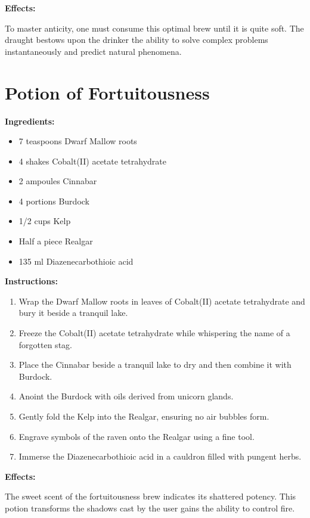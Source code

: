 \documentclass{article}
\begin{document}
\textbf{Effects:}

To master anticity, one must consume this optimal brew until it is quite soft. The draught bestows upon the drinker the ability to solve complex problems instantaneously and predict natural phenomena.

\newpage
\section*{Potion of Fortuitousness}

\textbf{Ingredients:}

\begin{itemize}
  \item 7 teaspoons Dwarf Mallow roots
  \item 4 shakes Cobalt(II) acetate tetrahydrate
  \item 2 ampoules Cinnabar
  \item 4 portions Burdock
  \item 1/2 cups Kelp
  \item Half a piece Realgar
  \item 135 ml Diazenecarbothioic acid
\end{itemize}

\textbf{Instructions:}

\begin{enumerate}
  \item Wrap the Dwarf Mallow roots in leaves of Cobalt(II) acetate tetrahydrate and bury it beside a tranquil lake.
  \item Freeze the Cobalt(II) acetate tetrahydrate while whispering the name of a forgotten stag.
  \item Place the Cinnabar beside a tranquil lake to dry and then combine it with Burdock.
  \item Anoint the Burdock with oils derived from unicorn glands.
  \item Gently fold the Kelp into the Realgar, ensuring no air bubbles form.
  \item Engrave symbols of the raven onto the Realgar using a fine tool.
  \item Immerse the Diazenecarbothioic acid in a cauldron filled with pungent herbs.
\end{enumerate}

\textbf{Effects:}

The sweet scent of the fortuitousness brew indicates its shattered potency. This potion transforms the shadows cast by the user gains the ability to control fire.
\end{document}
